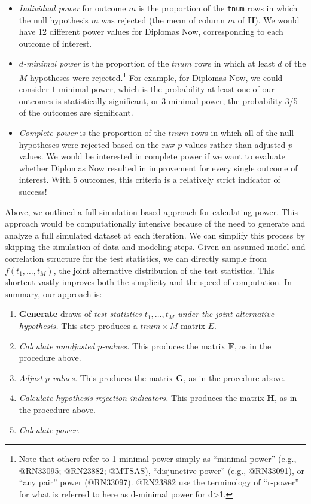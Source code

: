 \documentclass[
]{article}
\providecommand{\tightlist}{%
  \setlength{\itemsep}{0pt}\setlength{\parskip}{0pt}}
\begin{document}
\begin{itemize}
\item
  \emph{Individual power} for outcome \(m\) is the proportion of the
  \texttt{tnum} rows in which the null hypothesis \(m\) was rejected
  (the mean of column \(m\) of \(\mathbf{H}\)). We would have 12
  different power values for Diplomas Now, corresponding to each outcome
  of interest.
\item
  \emph{\(d\)-minimal power} is the proportion of the \(tnum\) rows in
  which at least \(d\) of the \(M\) hypotheses were
  rejected.\footnote{Note that others refer to 1-minimal power simply as “minimal power” (e.g., @RN33095; @RN23882; @MTSAS), “disjunctive power” (e.g., @RN33091), or “any pair” power (@RN33097). @RN23882 use the terminology of “r-power” for what is referred to here as d-minimal power for d>1.}
  For example, for Diplomas Now, we could consider \(1\)-minimal power,
  which is the probability at least one of our outcomes is statistically
  significant, or \(3\)-minimal power, the probability 3/5 of the
  outcomes are significant.
\item
  \emph{Complete power} is the proportion of the \(tnum\) rows in which
  all of the null hypotheses were rejected based on the raw \(p\)-values
  rather than adjusted \(p\)-values. We would be interested in complete
  power if we want to evaluate whether Diplomas Now resulted in
  improvement for every single outcome of interest. With \(5\) outcomes,
  this criteria is a relatively strict indicator of success!
\end{itemize}

Above, we outlined a full simulation-based approach for calculating
power. This approach would be computationally intensive because of the
need to generate and analyze a full simulated dataset at each iteration.
We can simplify this process by skipping the simulation of data and
modeling steps. Given an assumed model and correlation structure for the
test statistics, we can directly sample from \(f(t_1, \dots, t_M)\), the
joint alternative distribution of the test statistics. This shortcut
vastly improves both the simplicity and the speed of computation. In
summary, our approach is:

\begin{enumerate}
\def\labelenumi{\arabic{enumi}.}
\tightlist
\item
  \textbf{Generate} draws of \emph{test statistics \(t_1, \dots, t_M\)
  under the joint alternative hypothesis.} This step produces a
  \(tnum \times M\) matrix \(E\).
\item
  \emph{Calculate unadjusted \(p\)-values.} This produces the matrix
  \(\mathbf{F}\), as in the procedure above.
\item
  \emph{Adjust \(p\)-values.} This produces the matrix \(\mathbf{G}\),
  as in the procedure above.
\item
  \emph{Calculate hypothesis rejection indicators.} This produces the
  matrix \(\mathbf{H}\), as in the procedure above.
\item
  \emph{Calculate power.}
\end{enumerate}
\end{document}

